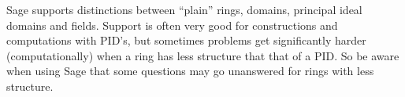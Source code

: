 Sage supports distinctions between ``plain'' rings, domains, principal ideal domains and fields.  Support is often very good for constructions and computations with PID's, but sometimes problems get significantly harder (computationally) when a ring has less structure that that of a PID.  So be aware when using Sage that some questions may go unanswered for rings with less structure.